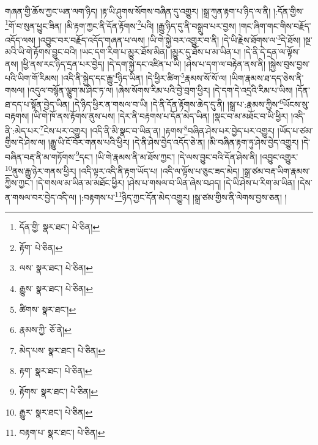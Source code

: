གཞན་གྱི་ཆོས་ཀྱང་ཡན་ལག་ཉིད། །རྟ་ཡི་ཤུགས་སོགས་བཞིན་དུ་འགྱུར། །སྒྲ་ཀུན་རྟག་པ་ཉིད་ལ་ནི། །:དོན་གྱིས་\footnote{དོན་གྱི་  སྣར་ཐང་།  པེ་ཅིན། }གོ་བ་སུན་ཕྱུང་ཟིན། །མི་རྟག་ཀྱང་ནི་དོན་རྟོགས་\footnote{རྟོག་  པེ་ཅིན། }པའི། །རྒྱུ་ཉིད་དུ་ནི་བསྒྲུབ་པར་བྱས། །གང་ཞིག་གང་གིས་བརྗོད་འདོད་ལས། །འབྱུང་བར་བརྗོད་འདོད་གཞན་པ་ལས། །ཡི་གེ་སྐྱེ་བར་འགྱུར་བ་ནི། །དེ་ཡི་རྗེས་ཐོགས་ལ་\footnote{ལས་  སྣར་ཐང་།  པེ་ཅིན། }དེ་ཐོས། །སྔ་མའི་ཡི་གེ་རྟོགས་བྱུང་བའི། །ཡང་དག་རིག་པ་མྱུར་ཐོས་མིན། །མྱུར་དུ་ཐོས་པ་མ་ཡིན་པ། །དེ་ནི་དེ་དྲན་ལ་ལྟོས་ནས། །ཕྱི་ནས་རང་ཉིད་དྲན་པར་བྱེད། །དེ་དག་སྐྱེ་དང་འཛིན་པ་ཡི། །ཤེས་པ་དག་ལ་བརྟེན་ནས་ནི། །སྐྱེས་བུས་བྱས་པའི་ཡིག་གོ་རིམས། །འདི་ནི་སྐྱེད་དང་རྒྱུ་\footnote{རྒྱུས་  སྣར་ཐང་།  པེ་ཅིན། }ཉིད་ཡིན། །དེ་ཕྱིར་ཚིག་\footnote{ཚིགས་  སྣར་ཐང་། }རྣམས་སོ་སོ་ལ། །ཡིག་རྣམས་ཐ་དད་ཅེས་ནི་གསལ། །འདུལ་བསྙོན་ལྕུག་མ་ཤིང་ཏ་ལ། །ཞེས་སོགས་རིམ་པའི་བྱེ་བྲག་ཕྱིར། །དེ་དག་དེ་འདྲའི་རིམ་པ་ཡིས། །དོན་ཐ་དད་པ་སྟོན་བྱེད་ཡིན། །དེ་ཉིད་ཕྱིར་ན་གསལ་བ་ཡི། །དེ་ནི་དོན་རྟོགས་ཆེད་དུ་ནི། །སྒྲ་པ་:རྣམས་ཀྱིས་\footnote{རྣམས་ཀྱི་  ཅོ་ནེ། }ཡོངས་སུ་བརྟགས། །ཡི་གེ་ཁོ་ནས་རྟོགས་ནུས་པས། །དེར་ནི་བརྟགས་པ་དོན་མེད་ཡིན། །སྣང་བ་མ་མཐོང་བ་ཡི་ཕྱིར། །འདི་ནི་:མེད་པར་\footnote{མེད་པས་  སྣར་ཐང་།  པེ་ཅིན། }ངེས་པར་འགྱུར། །འདི་ནི་མི་སྣང་བ་ཡིན་ན། །རྟགས་\footnote{རྟག་  སྣར་ཐང་།  པེ་ཅིན། }བཞིན་ཤེས་པར་བྱེད་པར་འགྱུར། །ཡོད་པ་ཙམ་གྱིས་དེ་ཤེས་ལ། །རྒྱུ་ཡི་ངོ་བོར་གནས་པའི་ཕྱིར། །དེ་ནི་ཤེས་བྱེད་འདོད་ཅེ་ན། །མི་བཞིན་རྟག་ཏུ་ཤེས་བྱེད་འགྱུར། །དེ་བཞིན་བརྡ་ནི་མ་གཏོགས་\footnote{རྟོགས་  སྣར་ཐང་།  པེ་ཅིན། }དང་། །ཡི་གེ་རྣམས་ནི་མ་ཐོས་ཀྱང་། །དེ་ལས་བྱུང་བའི་དོན་ཤེས་ནི། །འབྱུང་འགྱུར་\footnote{རྒྱུར་  སྣར་ཐང་།  པེ་ཅིན། }ནུས་རྒྱུ་ཉེར་གནས་ཕྱིར། །འདི་ལྟར་འདི་ནི་རྟག་ཡོད་པ། །འདི་ལ་ལྟོས་པ་ཅུང་ཟད་མེད། །སྒྲ་ཙམ་བརྡ་ཡིག་རྣམས་ཀྱིས་ཀྱང་། །དེ་གསལ་མ་ཡིན་མ་མཐོང་ཕྱིར། །ཤེས་པ་གསལ་བ་ཡིན་ཞེས་བཤད། །དེ་ཡི་ཤེས་པ་རིག་མ་ཡིན། །དེས་ན་གསལ་བར་བྱེད་འདི་ལ། །:བརྟགས་པ་\footnote{བརྟག་པ་  སྣར་ཐང་།  པེ་ཅིན། }ཉིད་ཀྱང་དོན་མེད་འགྱུར། །སྒྲ་ཙམ་གྱིས་ནི་ལེགས་བྱས་ཅན། །
